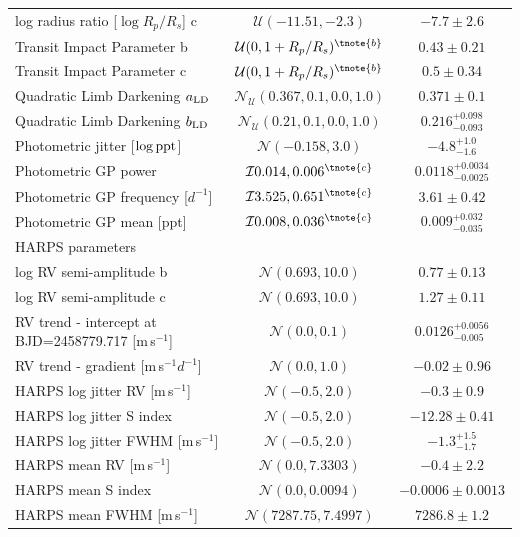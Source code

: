 \documentclass[fleqn,usenatbib]{mnras}
\newcommand{\harps}{{HARPS}}
\newcommand{\ms}{m\,s$^{-1}$}
\begin{document}
\begin{table}
\begin{center}
\begin{tabular}{lcc}
log radius ratio [$\log{R_p/R_s}$] c &  $\mathcal{U}(-11.51,-2.3)$  &   $ -7.7 \pm 2.6 $ \\
Transit Impact Parameter b & $\mathcal{U}(0,1+R_p/R_s)^{\tnote{b}}$  &   $ 0.43 \pm 0.21 $ \\
Transit Impact Parameter c & $\mathcal{U}(0,1+R_p/R_s)^{\tnote{b}}$  &   $ 0.5 \pm 0.34 $ \\
Quadratic Limb Darkening $a_{\rm LD}$ &  $\mathcal{N}_{\mathcal{U}}(0.367,0.1,0.0,1.0)$  &   $ 0.371 \pm 0.1 $ \\
Quadratic Limb Darkening $b_{\rm LD}$ &  $\mathcal{N}_{\mathcal{U}}(0.21,0.1,0.0,1.0)$  &   $ 0.216^{+0.098}_{-0.093} $ \\
Photometric jitter [$\log{\rm ppt}$] &  $\mathcal{N}(-0.158,3.0)$  &   $ -4.8^{+1.0}_{-1.6} $ \\
Photometric GP power & $\mathcal{I}{0.014,0.006}^{\tnote{c}}$  &   $ 0.0118^{+0.0034}_{-0.0025} $ \\
Photometric GP frequency [$d^{-1}$] & $\mathcal{I}{3.525,0.651}^{\tnote{c}}$  &   $ 3.61 \pm 0.42 $ \\
Photometric GP mean [ppt] & $\mathcal{I}{0.008,0.036}^{\tnote{c}}$  &   $ 0.009^{+0.032}_{-0.035} $ \\
\hline
\multicolumn{3}{l}{\harps{} parameters}\\
log RV semi-amplitude b &  $\mathcal{N}(0.693,10.0)$  &   $ 0.77 \pm 0.13 $ \\
log RV semi-amplitude c &  $\mathcal{N}(0.693,10.0)$  &   $ 1.27 \pm 0.11 $ \\
RV trend - intercept at BJD=2458779.717 [\ms{}] &  $\mathcal{N}(0.0,0.1)$  &   $ 0.0126^{+0.0056}_{-0.005} $ \\
RV trend - gradient [\ms{}$d^{-1}$] &  $\mathcal{N}(0.0,1.0)$  &   $ -0.02 \pm 0.96 $ \\
\harps{} log jitter RV [\ms{}] &  $\mathcal{N}(-0.5,2.0)$  &   $ -0.3 \pm 0.9 $ \\
\harps{} log jitter S index &  $\mathcal{N}(-0.5,2.0)$  &   $ -12.28 \pm 0.41 $ \\
\harps{} log jitter FWHM [\ms{}] &  $\mathcal{N}(-0.5,2.0)$  &   $ -1.3^{+1.5}_{-1.7} $ \\
\harps{} mean RV [\ms{}] &  $\mathcal{N}(0.0,7.3303)$  &   $ -0.4 \pm 2.2 $ \\
\harps{} mean S index &  $\mathcal{N}(0.0,0.0094)$  &   $ -0.0006 \pm 0.0013 $ \\
\harps{} mean FWHM [\ms{}] &  $\mathcal{N}(7287.75,7.4997)$  &   $ 7286.8 \pm 1.2 $ \\

\end{tabular}
\end{center}
\end{table}
\end{document}
